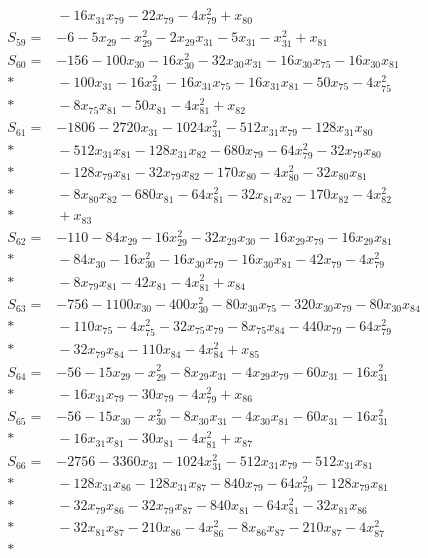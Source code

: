 \begin{align*}
&{}-16x_{31}x_{79}-22x_{79}-4x_{79}^{2}+x_{80}\\[3pt]
S_{59}={}&-6-5x_{29}-x_{29}^{2}-2x_{29}x_{31}-5x_{31}-x_{31}^{2}+x_{81}\\[3pt]
S_{60}={}&-156-100x_{30}-16x_{30}^{2}-32x_{30}x_{31}-16x_{30}x_{75}-16x_{30}x_{81}\\*
&{}-100x_{31}-16x_{31}^{2}-16x_{31}x_{75}-16x_{31}x_{81}-50x_{75}-4x_{75}^{2}\\*
&{}-8x_{75}x_{81}-50x_{81}-4x_{81}^{2}+x_{82}\\[3pt]
S_{61}={}&-1806-2720x_{31}-1024x_{31}^{2}-512x_{31}x_{79}-128x_{31}x_{80}\\*
&{}-512x_{31}x_{81}-128x_{31}x_{82}-680x_{79}-64x_{79}^{2}-32x_{79}x_{80}\\*
&{}-128x_{79}x_{81}-32x_{79}x_{82}-170x_{80}-4x_{80}^{2}-32x_{80}x_{81}\\*
&{}-8x_{80}x_{82}-680x_{81}-64x_{81}^{2}-32x_{81}x_{82}-170x_{82}-4x_{82}^{2}\\*
&{}+x_{83}\\[3pt]
S_{62}={}&-110-84x_{29}-16x_{29}^{2}-32x_{29}x_{30}-16x_{29}x_{79}-16x_{29}x_{81}\\*
&{}-84x_{30}-16x_{30}^{2}-16x_{30}x_{79}-16x_{30}x_{81}-42x_{79}-4x_{79}^{2}\\*
&{}-8x_{79}x_{81}-42x_{81}-4x_{81}^{2}+x_{84}\\[3pt]
S_{63}={}&-756-1100x_{30}-400x_{30}^{2}-80x_{30}x_{75}-320x_{30}x_{79}-80x_{30}x_{84}\\*
&{}-110x_{75}-4x_{75}^{2}-32x_{75}x_{79}-8x_{75}x_{84}-440x_{79}-64x_{79}^{2}\\*
&{}-32x_{79}x_{84}-110x_{84}-4x_{84}^{2}+x_{85}\\[3pt]
S_{64}={}&-56-15x_{29}-x_{29}^{2}-8x_{29}x_{31}-4x_{29}x_{79}-60x_{31}-16x_{31}^{2}\\*
&{}-16x_{31}x_{79}-30x_{79}-4x_{79}^{2}+x_{86}\\[3pt]
S_{65}={}&-56-15x_{30}-x_{30}^{2}-8x_{30}x_{31}-4x_{30}x_{81}-60x_{31}-16x_{31}^{2}\\*
&{}-16x_{31}x_{81}-30x_{81}-4x_{81}^{2}+x_{87}\\[3pt]
S_{66}={}&-2756-3360x_{31}-1024x_{31}^{2}-512x_{31}x_{79}-512x_{31}x_{81}\\*
&{}-128x_{31}x_{86}-128x_{31}x_{87}-840x_{79}-64x_{79}^{2}-128x_{79}x_{81}\\*
&{}-32x_{79}x_{86}-32x_{79}x_{87}-840x_{81}-64x_{81}^{2}-32x_{81}x_{86}\\*
&{}-32x_{81}x_{87}-210x_{86}-4x_{86}^{2}-8x_{86}x_{87}-210x_{87}-4x_{87}^{2}\\*

\end{align*}
